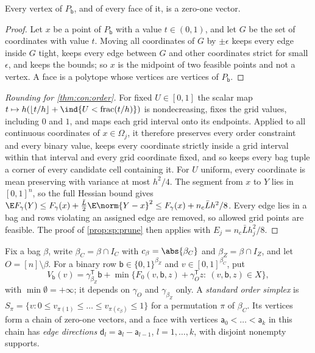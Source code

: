 \begin{lemma}\label{lem:con:order-vertices}
Every vertex of $P_{\mathsf b}$, and of every face of it, is a zero-one vector.
\end{lemma}

\begin{proof}
Let $x$ be a point of $P_{\mathsf b}$ with a value $t\in(0,1)$, and let $G$ be
the set of coordinates with value $t$. Moving all coordinates of $G$ by
$\pm\epsilon$ keeps every edge inside $G$ tight, keeps every edge between
$G$ and other coordinates strict for small $\epsilon$, and keeps the bounds;
so $x$ is the midpoint of two feasible points and not a vertex. A face is a
polytope whose vertices are vertices of $P_{\mathsf b}$.
\end{proof}

\begin{proof}[Rounding for \cref{thm:con:order}]
For fixed $U\in[0,1]$ the scalar map
$t\mapsto h(\lfloor t/h\rfloor+\ind\{U<\operatorname{frac}(t/h)\})$ is
nondecreasing, fixes the grid values, including $0$ and $1$, and maps each
grid interval onto its endpoints. Applied to all continuous coordinates of
$x\in\Omega_j$, it therefore preserves every order constraint and every
binary value, keeps every coordinate strictly inside a grid interval within
that interval and every grid coordinate fixed, and so keeps every bag tuple
a corner of every candidate cell containing it. For $U$ uniform, every
coordinate is mean preserving with variance at most $h^2/4$. The segment from
$x$ to $Y$ lies in $[0,1]^n$, so the full Hessian bound gives
$\E F_\gamma(Y)\le F_\gamma(x)+\frac{\bar L}2\E\norm{Y-x}^2\le F_\gamma(x)+n_c\bar
Lh^2/8$. Every edge lies in a bag and rows violating an assigned edge are
removed, so allowed grid points are feasible. The proof of
\cref{prop:sp:prune} then applies with $E_j=n_c\bar Lh_j^2/8$.
\end{proof}

Fix a bag $\beta$, write $\beta_C=\beta\cap I_C$ with $c_\beta=\abs{\beta_C}$ and
$\beta_Z=\beta\cap I_Z$, and let $O=[n]\setminus\beta$. For a binary row
$\mathsf b\in\{0,1\}^{\beta_Z}$ and $v\in[0,1]^{\beta_C}$, put
\[
 V_{\mathsf b}(v)=\gamma_{\beta_Z}^{\mathsf T}\mathsf b+\min\bigl\{F_0(v,\mathsf
 b,z)+\gamma_O^{\mathsf T}z:\ (v,\mathsf b,z)\in X\bigr\},
\]
with $\min\emptyset=+\infty$; it depends on $\gamma_O$ and $\gamma_{\beta_Z}$
only. A \emph{standard order simplex} is
$S_\pi=\{v:0\le v_{\pi(1)}\le\dots\le v_{\pi(c_\beta)}\le1\}$ for a permutation
$\pi$ of $\beta_C$. Its vertices form a chain of zero-one vectors, and a face
with vertices $\mathsf a_0<\dots<\mathsf a_k$ in this chain has \emph{edge
directions} $\mathsf d_l=\mathsf a_l-\mathsf a_{l-1}$, $l=1,\dots,k$, with
disjoint nonempty supports.

